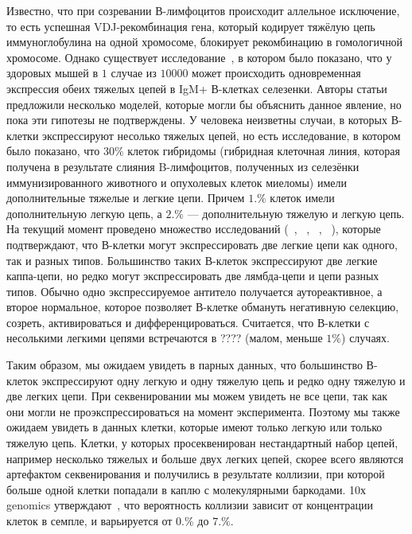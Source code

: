 \documentclass{spbau-diploma}
\begin{document}
Известно, что при созревании В-лимфоцитов происходит аллельное исключение, то есть успешная VDJ-рекомбинация гена, который кодирует тяжёлую цепь иммуноглобулина на одной хромосоме, блокирует  рекомбинацию в гомологичной хромосоме.
Однако существует исследование~\cite{barreto2000frequency}, в котором было показано, что у здоровых мышей в $1$ случае из $10000$ может происходить одновременная экспрессия обеих тяжелых цепей в IgM+ В-клетках селезенки.
Авторы статьи предложили несколько моделей, которые могли бы объяснить данное явление, но пока эти гипотезы не подтверждены.
У человека неизветны случаи, в которых В-клетки экспрессируют несолько тяжелых цепей, но есть исследование, в котором было показано, что $30\%$ клеток гибридомы (гибридная клеточная линия, которая получена в результате слияния B-лимфоцитов, полученных из селезёнки иммунизированного животного и опухолевых клеток миеломы) имели дополнительные тяжелые и легкие цепи.
Причем  $1.
\%$ клеток имели дополнительную легкую цепь, а $2.
\%$ --- дополнительную тяжелую и легкую цепь.
На текущий момент проведено множество исследований (~\cite{pelanda2014dual}, ~\cite{casellas2007igkappa}, ~\cite{liu2005receptor}, ~\cite{fraser2015immunoglobulin}), которые подтверждают, что В-клетки могут экспрессировать две легкие цепи как одного, так и разных типов.
Большинство таких В-клеток экспрессируют две легкие каппа-цепи, но редко могут экспрессировать две лямбда-цепи и цепи разных типов.
Обычно одно экспрессируемое антитело получается аутореактивное, а второе нормальное, которое позволяет В-клетке обмануть негативную селекцию, созреть, активироваться и дифференцироваться.
Считается, что В-клетки  с несолькими легкими цепями встречаются в ???? (малом, меньше $1\%$) случаях.


Таким образом, мы ожидаем увидеть в парных данных, что большинство В-клеток экспрессируют одну легкую и одну тяжелую цепь и редко одну тяжелую и две легких цепи.
При секвенировании мы можем увидеть не все цепи, так как они могли не проэкспрессироваться на момент эксперимента.
Поэтому мы также ожидаем увидеть в данных клетки, которые имеют только легкую или только тяжелую цепь.
Клетки, у которых просеквенирован нестандартный набор цепей, например несколько тяжелых и больше двух легких цепей, скорее всего являются артефактом секвенирования и получились в результате коллизии, при которой больше одной клетки попадали в каплю с молекулярными баркодами.
10х genomics утверждают~\cite{10x_manual}, что вероятность коллизии зависит от концентрации клеток в семпле, и варьируется от $0.
\%$ до $7.
\%$.
\end{document}
